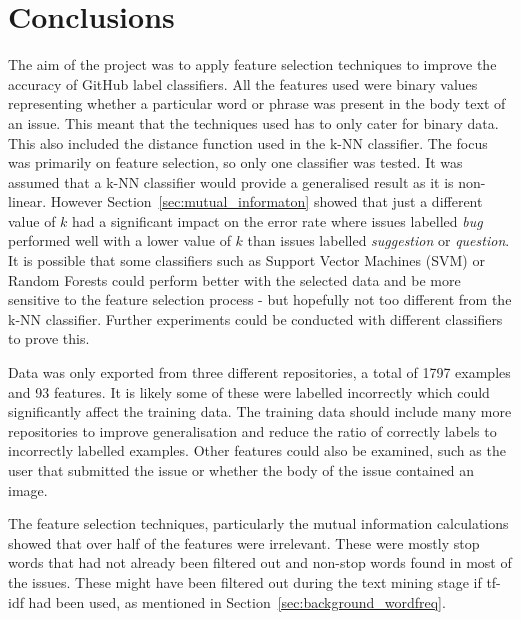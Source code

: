 \cite{mltechniques_spamfiltering}
\cite{mlmethods_spamfiltering}

\section{Conclusions}
The aim of the project was to apply feature selection techniques to improve the accuracy of GitHub label classifiers. All the
features used were binary values representing whether a particular word or phrase was present in the body text of an issue. This
meant that the techniques used has to only cater for binary data. This also included the distance function used in the k-NN
classifier. The focus was primarily on feature selection, so only one classifier was tested. It was assumed that a k-NN
classifier would provide a generalised result as it is non-linear. However Section~\ref{sec:mutual_informaton} showed that just
a different value of $k$ had a significant impact on the error rate where issues labelled \textit{bug} performed well with a
lower value of $k$ than issues labelled \textit{suggestion} or \textit{question}. It is possible that some classifiers such as
Support Vector Machines (SVM) or Random Forests could perform better with the selected data and be more sensitive to the feature
selection process - but hopefully not too different from the k-NN classifier. Further experiments could be conducted with
different classifiers to prove this.

Data was only exported from three different repositories, a total of 1797 examples and 93 features. It is likely some of these
were labelled incorrectly which could significantly affect the training data. The training data should include many more
repositories to improve generalisation and reduce the ratio of correctly labels to incorrectly labelled examples. Other features
could also be examined, such as the user that submitted the issue or whether the body of the issue contained an image.

The feature selection techniques, particularly the mutual information calculations showed that over half of the features were
irrelevant. These were mostly stop words that had not already been filtered out and non-stop words found in most of the issues.
These might have been filtered out during the text mining stage if tf-idf had been used, as mentioned in
Section~\ref{sec:background_wordfreq}.

